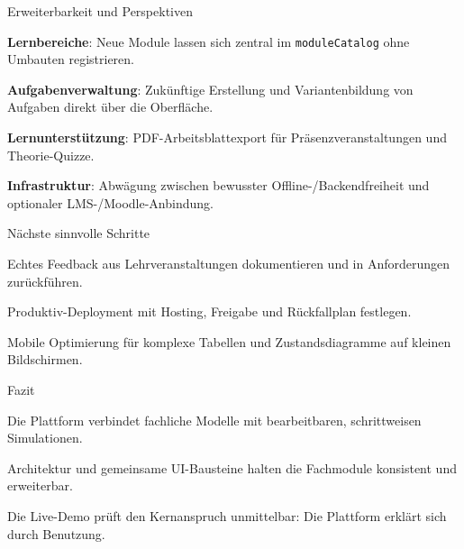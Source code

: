 
\begin{itemframe}{Erweiterbarkeit und Perspektiven}
  \item \textbf{Lernbereiche}: Neue Module lassen sich zentral im \texttt{moduleCatalog} ohne Umbauten registrieren.
  \item \textbf{Aufgabenverwaltung}: Zukünftige Erstellung und Variantenbildung von Aufgaben direkt über die Oberfläche.
  \item \textbf{Lernunterstützung}: PDF-Arbeitsblattexport für Präsenzveranstaltungen und Theorie-Quizze.
  \item \textbf{Infrastruktur}: Abwägung zwischen bewusster Offline-/Backendfreiheit und optionaler LMS-/Moodle-Anbindung.
\end{itemframe}

\begin{itemframe}{Nächste sinnvolle Schritte}
  \item Echtes Feedback aus Lehrveranstaltungen dokumentieren und in Anforderungen zurückführen.
  \item Produktiv-Deployment mit Hosting, Freigabe und Rückfallplan festlegen.
  \item Mobile Optimierung für komplexe Tabellen und Zustandsdiagramme auf kleinen Bildschirmen.
\end{itemframe}

\begin{itemframe}{Fazit}
  \item Die Plattform verbindet fachliche Modelle mit bearbeitbaren, schrittweisen Simulationen.
  \item Architektur und gemeinsame UI-Bausteine halten die Fachmodule konsistent und erweiterbar.
  \item Die Live-Demo prüft den Kernanspruch unmittelbar: Die Plattform erklärt sich durch Benutzung.
\end{itemframe}
